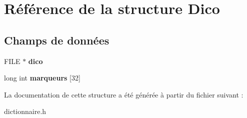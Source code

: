 \hypertarget{structDico}{
\section{Référence de la structure Dico}
\label{structDico}
}
\subsection*{Champs de données}
\begin{DoxyCompactItemize}
\item 
\hypertarget{structDico_aa608808df162aebf2b2bfbc4723cfad6}{
FILE $\ast$ {\bfseries dico}}
\label{structDico_aa608808df162aebf2b2bfbc4723cfad6}

\item 
\hypertarget{structDico_a1a8a33881f938f4ddd946edc97ae82f8}{
long int {\bfseries marqueurs} \mbox{[}32\mbox{]}}
\label{structDico_a1a8a33881f938f4ddd946edc97ae82f8}

\end{DoxyCompactItemize}


La documentation de cette structure a été générée à partir du fichier suivant :\begin{DoxyCompactItemize}
\item 
dictionnaire.h\end{DoxyCompactItemize}
